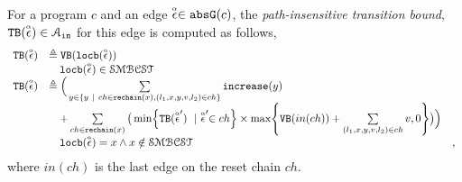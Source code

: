 %
%
\begin{defn}
  \label{def:edge_pathinsensitivebound}
  For a program $c$ and an edge $\stackrel{\scriptscriptstyle{\alpha}}{\mathtt{\epsilon}{}} \in \mathtt{abs}{\mathtt{G}}(c)$, the \emph{path-insensitive transition bound},
  ${\mathtt{TB}}(\stackrel{\scriptscriptstyle{\alpha}}{\mathtt{\epsilon}{}}) \in \mathcal{A}_{\mathtt{in}}$ 
for this edge is
computed as follows,
\[ 
\begin{array}{lll}
  \absclr(\absevent) 
  & \triangleq \varinvar(\locbound(\absevent))  & \\
  & \quad \locbound(\absevent) \in \constdom & \\
  \absclr(\absevent) 
  & \triangleq \Big(
    \sum\limits_{y \in \{ y ~|~ 
    ch \in \resetchain(x), (l_1, x, y, v, l_2) \in ch \} } \incrs(y) & \\
    & \quad + 
  \sum\limits_{ch \in \resetchain(x)}
  \big( \min\left\{\absclr(\absevent') ~\mid~ \absevent' \in ch\right\} \times 
  \max\left\{\varinvar(in(ch)) + \sum\limits_{(l_1, x, y, v, l_2) \in ch } v, 0 \right\}\big) \Big)  & \\
  &  \quad \locbound(\absevent) = x \land x \notin \constdom & ,
\end{array}
  \]
 where $in(ch)$ is the last edge on the reset chain $ch$.
\end{defn}
